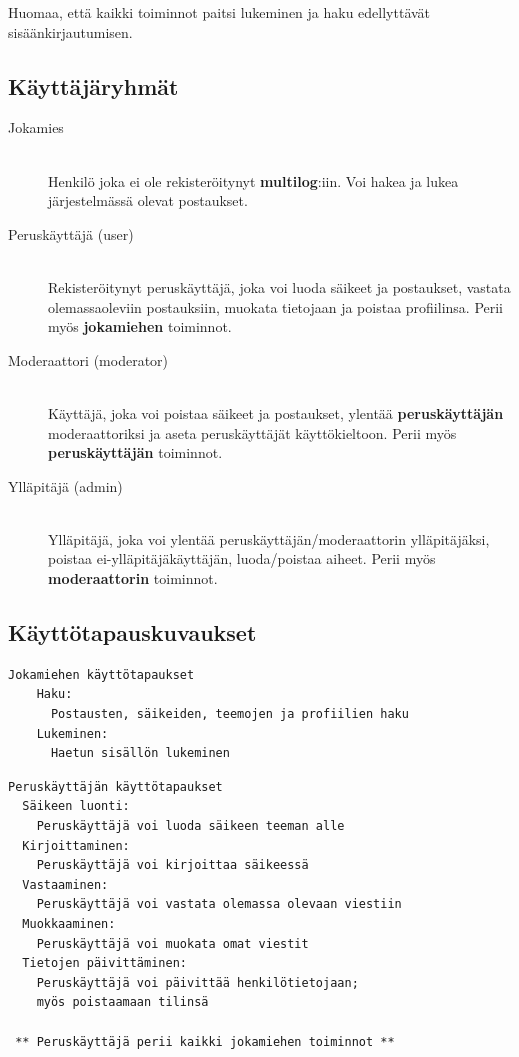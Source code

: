 \documentclass[10pt]{article}
\begin{document}
\noindent Huomaa, että kaikki toiminnot paitsi lukeminen ja haku edellyttävät sisäänkirjautumisen.
\subsection{Käyttäjäryhmät}
\begin{description}
  \item[Jokamies] \hfill \\
  Henkilö joka ei ole rekisteröitynyt \textbf{multilog}:iin. Voi hakea ja lukea järjestelmässä olevat postaukset.
  \item[Peruskäyttäjä (user)] \hfill \\
  Rekisteröitynyt peruskäyttäjä, joka voi luoda säikeet ja postaukset, vastata olemassaoleviin postauksiin, muokata tietojaan ja poistaa profiilinsa. Perii myös \textbf{jokamiehen} toiminnot.
  \item[Moderaattori (moderator)] \hfill \\
  Käyttäjä, joka voi poistaa säikeet ja postaukset, ylentää \textbf{peruskäyttäjän} moderaattoriksi ja aseta peruskäyttäjät käyttökieltoon. Perii myös \textbf{peruskäyttäjän} toiminnot.
  \item[Ylläpitäjä (admin)] \hfill \\
  Ylläpitäjä, joka voi ylentää peruskäyttäjän/moderaattorin ylläpitäjäksi, poistaa ei-ylläpitäjäkäyttäjän, luoda/poistaa aiheet. Perii myös \textbf{moderaattorin} toiminnot.
\end{description}

\subsection{Käyttötapauskuvaukset}
\begin{Verbatim}[frame=single]
Jokamiehen käyttötapaukset
    Haku:  
      Postausten, säikeiden, teemojen ja profiilien haku
    Lukeminen:
      Haetun sisällön lukeminen
\end{Verbatim}

\begin{Verbatim}[frame=single]
Peruskäyttäjän käyttötapaukset
  Säikeen luonti:
    Peruskäyttäjä voi luoda säikeen teeman alle
  Kirjoittaminen:
    Peruskäyttäjä voi kirjoittaa säikeessä
  Vastaaminen:
    Peruskäyttäjä voi vastata olemassa olevaan viestiin
  Muokkaaminen:
    Peruskäyttäjä voi muokata omat viestit
  Tietojen päivittäminen:
    Peruskäyttäjä voi päivittää henkilötietojaan; 
    myös poistaamaan tilinsä
    
 ** Peruskäyttäjä perii kaikki jokamiehen toiminnot **
\end{Verbatim}
\end{document}
